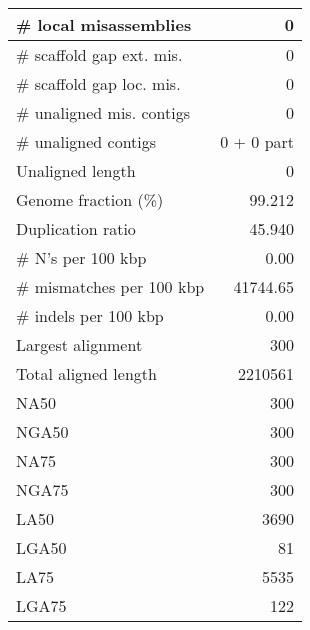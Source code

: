 \documentclass[12pt,a4paper]{article}
\begin{document}
\begin{table}[ht]
\begin{center}
\begin{tabular}{|l*{1}{|r}|}
\# local misassemblies & 0 \\ \hline
\# scaffold gap ext. mis. & 0 \\ \hline
\# scaffold gap loc. mis. & 0 \\ \hline
\# unaligned mis. contigs & 0 \\ \hline
\# unaligned contigs & 0 + 0 part \\ \hline
Unaligned length & 0 \\ \hline
Genome fraction (\%) & 99.212 \\ \hline
Duplication ratio & 45.940 \\ \hline
\# N's per 100 kbp & 0.00 \\ \hline
\# mismatches per 100 kbp & 41744.65 \\ \hline
\# indels per 100 kbp & 0.00 \\ \hline
Largest alignment & 300 \\ \hline
Total aligned length & 2210561 \\ \hline
NA50 & 300 \\ \hline
NGA50 & 300 \\ \hline
NA75 & 300 \\ \hline
NGA75 & 300 \\ \hline
LA50 & 3690 \\ \hline
LGA50 & 81 \\ \hline
LA75 & 5535 \\ \hline
LGA75 & 122 \\ \hline
\end{tabular}
\end{center}
\end{table}
\end{document}
